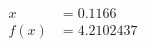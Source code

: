 \documentclass[preview]{standalone}
\begin{document}
\begin{align*}
x &= 0.1166\\f(x) &= 4.2102437
\end{align*}
\end{document}
